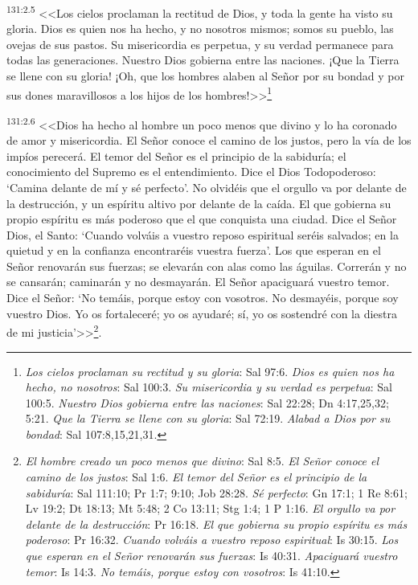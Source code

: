 \par 
\textsuperscript{131:2.5} <<Los cielos proclaman la rectitud de Dios, y toda la gente ha visto su gloria. Dios es quien nos ha hecho, y no nosotros mismos; somos su pueblo, las ovejas de sus pastos. Su misericordia es perpetua, y su verdad permanece para todas las generaciones. Nuestro Dios gobierna entre las naciones. ¡Que la Tierra se llene con su gloria! ¡Oh, que los hombres alaben al Señor por su bondad y por sus dones maravillosos a los hijos de los hombres!>>\footnote{\textit{Los cielos proclaman su rectitud y su gloria}: Sal 97:6. \textit{Dios es quien nos ha hecho, no nosotros}: Sal 100:3. \textit{Su misericordia y su verdad es perpetua}: Sal 100:5. \textit{Nuestro Dios gobierna entre las naciones}: Sal 22:28; Dn 4:17,25,32; 5:21. \textit{Que la Tierra se llene con su gloria}: Sal 72:19. \textit{Alabad a Dios por su bondad}: Sal 107:8,15,21,31.}

\par 
\textsuperscript{131:2.6} <<Dios ha hecho al hombre un poco menos que divino y lo ha coronado de amor y misericordia. El Señor conoce el camino de los justos, pero la vía de los impíos perecerá. El temor del Señor es el principio de la sabiduría; el conocimiento del Supremo es el entendimiento. Dice el Dios Todopoderoso: `Camina delante de mí y sé perfecto'. No olvidéis que el orgullo va por delante de la destrucción, y un espíritu altivo por delante de la caída. El que gobierna su propio espíritu es más poderoso que el que conquista una ciudad. Dice el Señor Dios, el Santo: `Cuando volváis a vuestro reposo espiritual seréis salvados; en la quietud y en la confianza encontraréis vuestra fuerza'. Los que esperan en el Señor renovarán sus fuerzas; se elevarán con alas como las águilas. Correrán y no se cansarán; caminarán y no desmayarán. El Señor apaciguará vuestro temor. Dice el Señor: `No temáis, porque estoy con vosotros. No desmayéis, porque soy vuestro Dios. Yo os fortaleceré; yo os ayudaré; sí, yo os sostendré con la diestra de mi justicia'>>\footnote{\textit{El hombre creado un poco menos que divino}: Sal 8:5. \textit{El Señor conoce el camino de los justos}: Sal 1:6. \textit{El temor del Señor es el principio de la sabiduría}: Sal 111:10; Pr 1:7; 9:10; Job 28:28. \textit{Sé perfecto}: Gn 17:1; 1 Re 8:61; Lv 19:2; Dt 18:13; Mt 5:48; 2 Co 13:11; Stg 1:4; 1 P 1:16. \textit{El orgullo va por delante de la destrucción}: Pr 16:18. \textit{El que gobierna su propio espíritu es más poderoso}: Pr 16:32. \textit{Cuando volváis a vuestro reposo espiritual}: Is 30:15. \textit{Los que esperan en el Señor renovarán sus fuerzas}: Is 40:31. \textit{Apaciguará vuestro temor}: Is 14:3. \textit{No temáis, porque estoy con vosotros}: Is 41:10.}.

